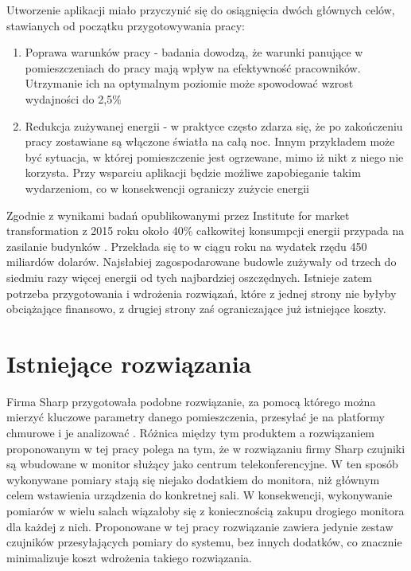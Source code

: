 \documentclass[11pt, a4]{article} %
\begin{document}
Utworzenie aplikacji miało przyczynić się do osiągnięcia dwóch głównych 
celów, stawianych od początku przygotowywania pracy:

\begin{enumerate} %
    \item Poprawa warunków pracy - badania \parencite{oseland:2012ak} dowodzą, że 
    warunki panujące w pomieszczeniach do pracy mają wpływ na efektywność pracowników. 
    Utrzymanie ich na optymalnym poziomie może spowodować wzrost wydajności do 2,5\%
    \item Redukcja zużywanej energii - w praktyce często zdarza się, że po zakończeniu 
    pracy zostawiane są włączone światła na całą noc. Innym przykładem może być 
    sytuacja, w której pomieszczenie jest ogrzewane, mimo iż nikt z niego nie korzysta. 
    Przy wsparciu aplikacji będzie możliwe zapobieganie takim wydarzeniom, co w 
    konsekwencji ograniczy zużycie energii
\end{enumerate}

Zgodnie z wynikami badań opublikowanymi przez Institute for market transformation z 
2015 roku około 40\% całkowitej konsumpcji energii przypada na zasilanie budynków 
\parencite{Imt.org:2015ag}. Przekłada się to w ciągu roku na wydatek rzędu 450 miliardów 
dolarów. Najsłabiej zagospodarowane budowle zużywały od trzech do siedmiu razy więcej 
energii od tych najbardziej oszczędnych. Istnieje zatem potrzeba przygotowania 
i wdrożenia rozwiązań, które z jednej strony nie byłyby obciążające finansowo, z 
drugiej strony zaś ograniczające już istniejące koszty. 

\section{Istniejące rozwiązania}
Firma Sharp przygotowała podobne rozwiązanie, za pomocą którego można mierzyć kluczowe 
parametry danego pomieszczenia, przesyłać je na platformy chmurowe i je analizować 
\parencite{sharp:2022am}. Różnica między tym produktem a rozwiązaniem proponowanym w tej pracy 
polega na tym, że w rozwiązaniu firmy Sharp czujniki są wbudowane w monitor służący 
jako centrum telekonferencyjne. W ten sposób wykonywane pomiary stają się niejako 
dodatkiem do monitora, niż głównym celem wstawienia urządzenia do konkretnej sali. 
W konsekwencji, wykonywanie pomiarów w wielu salach wiązałoby się z koniecznością 
zakupu drogiego monitora dla każdej z nich. Proponowane w tej pracy rozwiązanie zawiera 
jedynie zestaw czujników przesyłających pomiary do systemu, bez innych dodatków, co 
znacznie minimalizuje koszt wdrożenia takiego rozwiązania.
\end{document}
